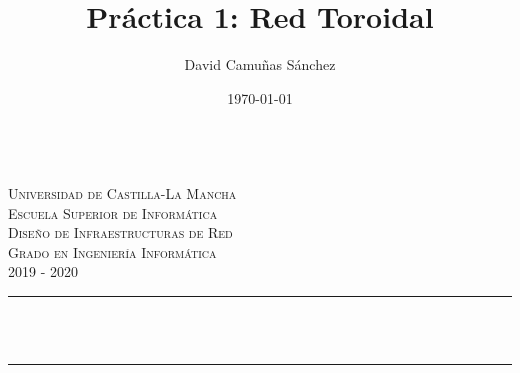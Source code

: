 \documentclass[11pt]{article}
\title{Práctica 1: Red Toroidal}							%
\author{David Camuñas Sánchez}							%
\date{\today}											%
\makeatletter
\newcommand{\subject}{Diseño de Infraestructuras de Red}						%
\newcommand{\course}{Grado en Ingeniería Informática}	%
\newcommand{\courseyear}{2019 - 2020} 					%
\let\thetitle\@title
\makeatother
\begin{document}

\begin{titlepage}
	\centering
	\begin{minipage}[t]{\textwidth}
		\hspace{\fill}
	\end{minipage}
	\\[2.25 cm]
    \textsc{\LARGE Universidad de Castilla-La Mancha}\\[1 cm]	%
    \textsc{\LARGE Escuela Superior de Informática}\\[2.0 cm]
	\textsc{\Large \subject}\\[0.5 cm]				%
	\textsc{\large \course \\ \courseyear}\\[2 cm]				%
	\rule{\linewidth}{0.2 mm} \\[0.4 cm]
	{ \huge \bfseries \thetitle}\\
	\rule{\linewidth}{0.2 mm} \\[2.5 cm]


\end{titlepage}
\end{document}
